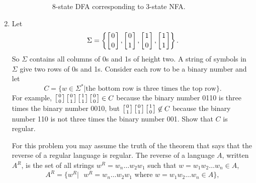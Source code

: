 \documentclass{article}
\newcommand{\duple}[2]{\left[{#1}\atop{#2}\right]}
\begin{document}
\begin{enumerate}
\begin{description}
  \begin{figure}[!htbp]
    \begin{center}
    \end{center}
    \caption{8-state DFA corresponding to 3-state NFA.}
    \label{dfathree}
    \end{figure}
  \end{description}
    


\newpage
\item
  Let
  \[
  \Sigma=\left\{\duple{0}{0},\duple{0}{1},\duple{1}{0},\duple{1}{1}\right\}.
  \]
  So $\Sigma$ contains all columns of 0s and 1s of height two.  A
  string of symbols in $\Sigma$ give two rows of 0s and 1s.  Consider
  each row to be a binary number and let
  \[
  C = \{w\in\Sigma^* | \mbox{the bottom row is three times the top
    row}\}.
  \]
  For example, $\duple 00\duple 01 \duple 11 \duple 00\in C$ because
  the binary number 0110 is three times the binary number 0010,
  but
  $\duple 01 \duple01\duple10\not\in C$ because the binary number 110
  is not three times the binary number 001.  Show that $C$ is
  regular.

  For this problem you may assume the truth of the theorem that says
  that the reverse of a regular language is regular.  The reverse of a
  language $A$, written $A^R$, is the set of all strings
  $w^R=w_n\ldots w_2w_1$ such that $w=w_1w_2\ldots w_n\in A$,
  \[
  A^R = \{w^R |  \mbox{ $w^R=w_n\ldots w_2w_1$ where  $w=w_1w_2\ldots
    w_n\in A$}\},
  \]


\end{enumerate}
\end{document}
